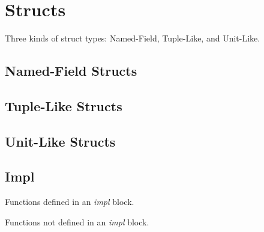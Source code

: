 \section{Structs}
Three kinds of struct types: Named-Field, Tuple-Like, and Unit-Like.
\subsection{Named-Field Structs}
\subsection{Tuple-Like Structs}
\subsection{Unit-Like Structs}
\subsection{Impl}
\begin{definition}
	Functions defined in an \emph{impl}	block.
\end{definition}
\begin{definition}
	Functions not defined in an \emph{impl} block.	
\end{definition}

